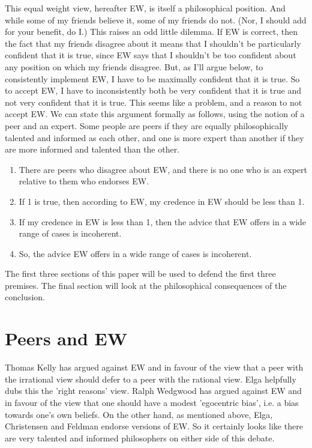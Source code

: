 This equal weight view, hereafter EW, is itself a philosophical position. And while some of my friends believe it, some of my friends do not. (Nor, I should add for your benefit, do I.) This raises an odd little dilemma. If EW is correct, then the fact that my friends disagree about it means that I shouldn't be particularly confident that it is true, since EW says that I shouldn't be too confident about any position on which my friends disagree. But, as I'll argue below, to consistently implement EW, I have to be maximally confident that it is true. So to accept EW, I have to inconsistently both be very confident that it is true and not very confident that it is true. This seems like a problem, and a reason to not accept EW. We can state this argument formally as follows, using the notion of a peer and an expert. Some people are peers if they are equally philosophically talented and informed as each other, and one is more expert than another if they are more informed and talented than the other.

\begin{enumerate}
\item There are peers who disagree about EW, and there is no one who is an expert relative to them who endorses EW.
\item If 1 is true, then according to EW, my credence in EW should be less than 1.
\item If my credence in EW is less than 1, then the advice that EW offers in a wide range of cases is incoherent.
\item So, the advice EW offers in a wide range of cases is incoherent.
\end{enumerate}

The first three sections of this paper will be used to defend the first three premises. The final section will look at the philosophical consequences of the conclusion.

\section{Peers and EW}
Thomas Kelly \citeyearpar{Kelly2005-KELTES} has argued against EW and in favour of the view that a peer with the irrational view should defer to a peer with the rational view. Elga helpfully dubs this the 'right reasons' view. Ralph Wedgwood \citeyearpar[Ch. 11]{Wedgwood2007-WEDNON} has argued against EW and in favour of the view that one should have a modest 'egocentric bias', i.e. a bias towards one's own beliefs. On the other hand, as mentioned above, Elga, Christensen and Feldman endorse versions of EW. So it certainly looks like there are very talented and informed philosophers on either side of this debate.

